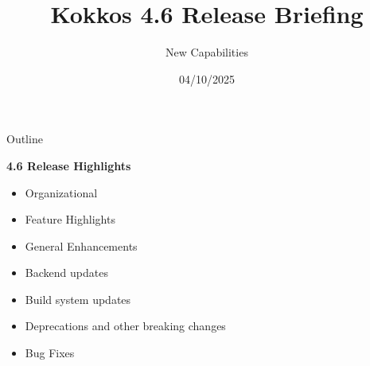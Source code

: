 
\usepackage{tikz}
\graphicspath{{4_6/figures/}}

\def\ornlid{THIS WILL NEED TO BE UPDATED AFTER RESOLUTION}

\title{Kokkos 4.6 Release Briefing}

\author{New Capabilities}

\date{04/10/2025}





\begin{frame}
  \titlepage
\end{frame}


\begin{frame}[fragile]{Outline}

  \textbf{4.6 Release Highlights}

  \begin{itemize}
    \item{Organizational}
    \item{Feature Highlights}
    \item{General Enhancements}
    \item{Backend updates}
    \item{Build system updates}
    \item{Deprecations and other breaking changes}
    \item{Bug Fixes}
  \end{itemize}

\end{frame}

